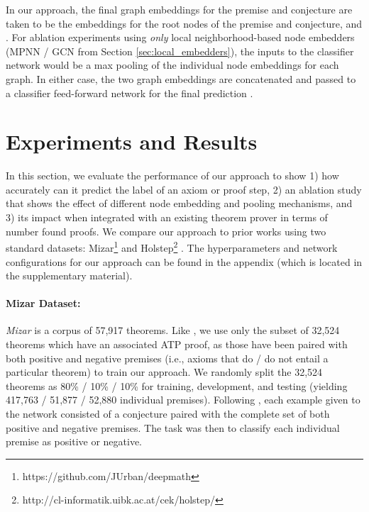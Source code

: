 \documentclass{article}
\begin{document}
In our approach, the final graph embeddings for the premise and conjecture are taken to be the embeddings for the root nodes of the premise and conjecture,  and . For ablation experiments using \textit{only} local neighborhood-based node embedders (MPNN / GCN from Section \ref{sec:local_embedders}), the inputs to the classifier network would be a max pooling of the individual node embeddings for each graph. In either case,
the two graph embeddings are concatenated and passed to a classifier feed-forward network  for the final prediction .
 
\section{Experiments and Results}
In this section, we evaluate the performance of our approach to show 1) how accurately can it predict the label of an axiom or proof step, 2) an ablation study that shows the effect of different node embedding and pooling mechanisms, and 3) its impact when integrated with an existing theorem prover in terms of number found proofs. We compare our approach to prior works using two standard datasets: Mizar\footnote{https://github.com/JUrban/deepmath} \cite{mizar40for40} and Holstep\footnote{http://cl-informatik.uibk.ac.at/cek/holstep/} \cite{kaliszyk2017holstep}. The hyperparameters and network configurations for our approach can be found in the appendix (which is located in the supplementary material).



\paragraph{Mizar Dataset: } \emph{Mizar} \cite{mizar40for40} is a  corpus of 57,917 theorems. Like \cite{irving2016deepmath,olvsak2019property,kucik2018premise}, we use only the subset of 32,524 theorems which have an associated ATP proof, as those have been paired with both positive and negative premises (i.e., axioms that do / do not entail a particular theorem) to train our approach. We randomly split the 32,524 theorems as 80\% / 10\% / 10\% for training, development, and testing (yielding 417,763 / 51,877 / 52,880 individual premises). Following \cite{olvsak2019property}, each example given to the network consisted of a conjecture paired with the complete set of both positive and negative premises. The task was then to classify each individual premise as positive or negative.
\end{document}

